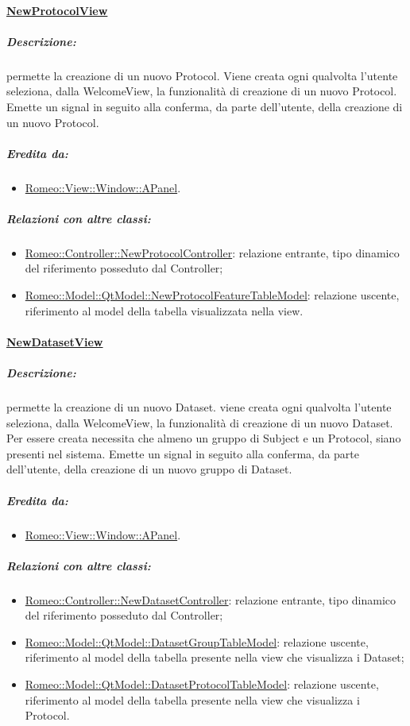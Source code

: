 		\paragraph{\underline{NewProtocolView}}
		\label{npv} 
			\subparagraph{Descrizione:} permette la creazione di un nuovo Protocol\glossario{}. Viene creata ogni qualvolta l'utente seleziona, dalla WelcomeView, la funzionalità di creazione di un nuovo Protocol\glossario{}. Emette un signal\g{} in seguito alla conferma, da parte dell'utente, della creazione di un nuovo Protocol\glossario{}.
			\subparagraph{Eredita da:}
				\begin{itemize}
				 	\item \hyperref[ab_panel]{Romeo::View::Window::APanel}.
				\end{itemize}
			\subparagraph{Relazioni con altre classi:}
				\begin{itemize}
					\item \hyperref[controller_np]{Romeo::Controller::NewProtocolController}: relazione entrante, tipo dinamico del riferimento posseduto dal Controller;
					\item \hyperref[controller_tm]{Romeo::Model::QtModel::NewProtocolFeatureTableModel}: relazione uscente, riferimento al model della tabella visualizzata nella view.
				\end{itemize}
		 
	\paragraph{\underline{NewDatasetView}}
	\label{ndv}
		\subparagraph{Descrizione:} permette la creazione di un nuovo Dataset\glossario{}.
		viene creata ogni qualvolta l'utente seleziona, dalla WelcomeView, la funzionalità di creazione di un nuovo Dataset\glossario{}. Per essere creata necessita che almeno un gruppo di Subject\g{} e un Protocol\g{}, siano presenti nel sistema. Emette un signal\g{} in seguito alla conferma, da parte dell'utente, della creazione di un nuovo gruppo di Dataset\glossario{}.
		\subparagraph{Eredita da:}
			\begin{itemize}
			\item \hyperref[ab_panel]{Romeo::View::Window::APanel}.
			\end{itemize}
		\subparagraph{Relazioni con altre classi:}
			\begin{itemize}
				\item \hyperref[controller_nd]{Romeo::Controller::NewDatasetController}: relazione entrante, tipo dinamico del riferimento posseduto dal Controller;
				\item \hyperref[controller_tm]{Romeo::Model::QtModel::DatasetGroupTableModel}: relazione uscente, riferimento al model della tabella presente nella view che visualizza i Dataset;
				\item \hyperref[controller_tm]{Romeo::Model::QtModel::DatasetProtocolTableModel}: relazione uscente, riferimento al model della tabella presente nella view che visualizza i Protocol.
			\end{itemize}
	
